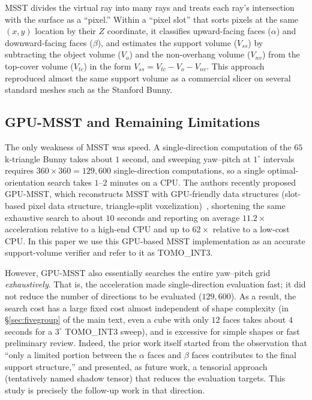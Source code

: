 \documentclass[11pt,a4paper]{article}
\begin{document}
MSST divides the virtual ray into many rays and treats each ray's intersection with the surface as a ``pixel.''
Within a ``pixel slot'' that sorts pixels at the same $(x,y)$ location by their $Z$ coordinate,
it classifies upward-facing faces ($\alpha$) and downward-facing faces ($\beta$),
and estimates the support volume ($V_{ss}$) by subtracting the object volume ($V_o$) and the
non-overhang volume ($V_{nv}$) from the top-cover volume ($V_{tc}$) in the form $V_{ss}=V_{tc}-V_o-V_{nv}$.
This approach reproduced almost the same support volume as a commercial slicer on several standard meshes such as the Stanford Bunny.

\subsection{GPU-MSST and Remaining Limitations}

The only weakness of MSST was speed.
A single-direction computation of the $65$k-triangle Bunny takes about $1$ second,
and sweeping yaw--pitch at $1^\circ$ intervals requires $360\times360=129{,}600$ single-direction computations,
so a single optimal-orientation search takes $1$--$2$ minutes on a CPU.
The authors recently proposed GPU-MSST, which reconstructs MSST with GPU-friendly data structures (slot-based pixel data structure, triangle-split voxelization)~\cite{gpumsst},
shortening the same exhaustive search to about $10$ seconds and reporting on average $11.2\times$ acceleration relative to a high-end CPU and up to $62\times$ relative to a low-cost CPU.
In this paper we use this GPU-based MSST implementation as an accurate support-volume verifier and refer to it as TOMO\_INT3.

However, GPU-MSST also essentially searches the entire yaw--pitch grid \emph{exhaustively}.
That is, the acceleration made single-direction evaluation fast; it did not reduce the number of directions to be evaluated ($129{,}600$).
As a result, the search cost has a large fixed cost almost independent of shape complexity
(in \S\ref{sec:fivegroup} of the main text, even a cube with only $12$ faces takes about $4$ seconds for a $3^\circ$ TOMO\_INT3 sweep),
and is excessive for simple shapes or fast preliminary review.
Indeed, the prior work itself started from the observation that ``only a limited portion between the $\alpha$ faces and $\beta$ faces contributes to the final support structure,''
and presented, as future work, a tensorial approach (tentatively named shadow tensor) that reduces the evaluation targets.
This study is precisely the follow-up work in that direction.
\end{document}
